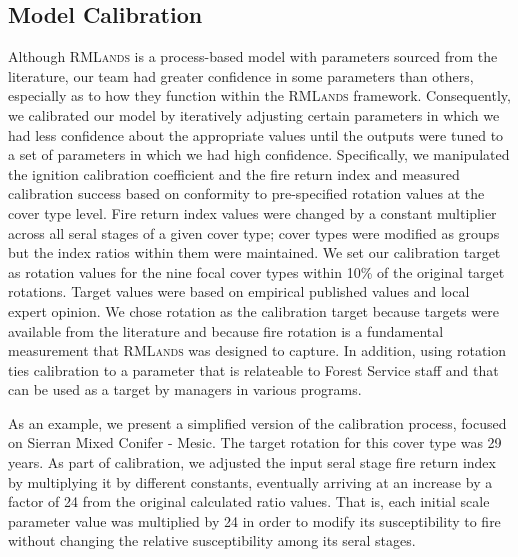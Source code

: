 \subsection{Model Calibration}
Although \textsc{RMLands} is a process-based model with parameters sourced from the literature, our team had greater confidence in some parameters than others, especially as to how they function within the \textsc{RMLands} framework. Consequently, we calibrated our model by iteratively adjusting certain parameters in which we had less confidence about the appropriate values until the outputs were tuned to a set of parameters in which we had high confidence. Specifically, we manipulated the ignition calibration coefficient and the fire return index and measured calibration success based on conformity to pre-specified rotation values at the cover type level. Fire return index values were changed by a constant multiplier across all seral stages of a given cover type; cover types were modified as groups but the index ratios within them were maintained. We set our calibration target as rotation values for the nine focal cover types within 10\% of the original target rotations. Target values were based on empirical published values and local expert opinion. We chose rotation as the calibration target because targets were available from the literature and because fire rotation is a fundamental measurement that \textsc{RMLands} was designed to capture. In addition, using rotation ties calibration to a parameter that is relateable to Forest Service staff and that can be used as a target by managers in various programs.

As an example, we present a simplified version of the calibration process, focused on Sierran Mixed Conifer - Mesic. The target rotation for this cover type was 29 years. As part of calibration, we adjusted the input seral stage fire return index by multiplying it by different constants, eventually arriving at an increase by a factor of 24 from the original calculated ratio values. That is, each initial scale parameter value was multiplied by 24 in order to modify its susceptibility to fire without changing the relative susceptibility among its seral stages. 



